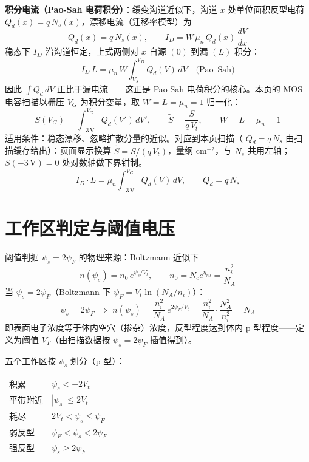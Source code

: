 \documentclass[11pt]{ctexart}
\begin{document}
\textbf{积分电流（Pao-Sah 电荷积分）}：缓变沟道近似下，沟道 $x$ 处单位面积反型电荷
\(Q_d(x)=q\,N_s(x)\)，漂移电流（迁移率模型）为
\[Q_d(x)=q\,N_s(x),\qquad I_D=W\,\mu_n\,Q_d(x)\,\frac{dV}{dx}\]
稳态下
\(I_D\) 沿沟道恒定，上式两侧对 $x$ 自源 $(0)$ 到漏 $(L)$ 积分：
\[I_D\,L=\mu_n\,W\int_{V_S}^{V_D} Q_d(V)\,dV\quad\text{(Pao--Sah)}\]
因此
\(\int Q_d\,dV\) 正比于漏电流——这正是 Pao-Sah 电荷积分的核心。本页的 MOS 电容扫描以栅压
\(V_G\) 为积分变量，取
\(W=L=\mu_n=1\) 归一化：
\[S(V_G)=\int_{-3\,\mathrm{V}}^{V_G} Q_d(V')\,dV',\qquad \tilde{S}=\frac{S}{q\,V_t},\qquad W=L=\mu_n=1\]
适用条件：稳态漂移、忽略扩散分量的近似。对应到本页扫描（
\(Q_d=q\,N_s\) 由扫描缓存给出）：页面显示换算
\(\tilde{S}=S/(q\,V_t)\)，量纲 cm$^{-2}$，与
\(N_s\) 共用左轴；
\(S(-3\,\mathrm{V})=0\) 处对数轴做下界钳制。
\[I_D\cdot L=\mu_n\int_{-3\,\mathrm{V}}^{V_G} Q_d(V)\,dV,\qquad Q_d=q\,N_s\]

\section{工作区判定与阈值电压}

阈值判据 $\psi_s=2\psi_F$ 的物理来源：Boltzmann 近似下
\[n(\psi_s)=n_0\,e^{\psi_s/V_t},\qquad n_0=N_c e^{\eta_{n0}}=\frac{n_i^2}{N_A}\]
当 $\psi_s=2\psi_F$（Boltzmann 下 $\psi_F=V_t\ln(N_A/n_i)$）：
\[\psi_s=2\psi_F\;\Rightarrow\;n(\psi_s)=\frac{n_i^2}{N_A}\,e^{2\psi_F/V_t}=\frac{n_i^2}{N_A}\cdot\frac{N_A^2}{n_i^2}=N_A\]
即表面电子浓度等于体内空穴（掺杂）浓度，反型程度达到体内 p 型程度——定义为阈值
\(V_T\)（由扫描数据按 $\psi_s=2\psi_F$ 插值得到）。

五个工作区按 $\psi_s$ 划分（p 型）：
\begin{center}
\begin{tabular}{ll}
积累 & %
\(\psi_s<-2V_t\) \\
平带附近 & %
\(|\psi_s|\le 2V_t\) \\
耗尽 & %
\(2V_t<\psi_s\le\psi_F\) \\
弱反型 & %
\(\psi_F<\psi_s<2\psi_F\) \\
强反型 & %
\(\psi_s\ge 2\psi_F\) \\
\end{tabular}
\end{center}
\end{document}
